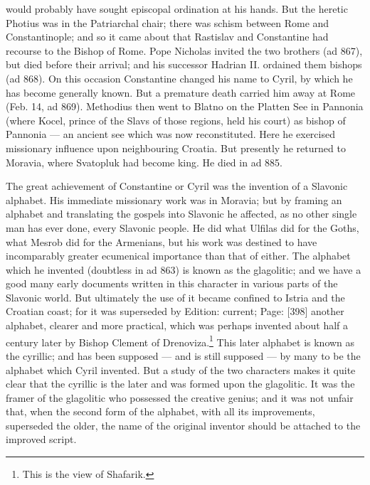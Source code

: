 would probably have sought episcopal ordination at his hands. But the heretic Photius was in the Patriarchal chair; there was schism between Rome and Constantinople; and so it came about that Rastislav and Constantine had recourse to the Bishop of Rome. Pope Nicholas invited the two brothers (ad 867), but died before their arrival; and his successor Hadrian II. ordained them bishops (ad 868). On this occasion Constantine changed his name to Cyril, by which he has become generally known. But a premature death carried him away at Rome (Feb. 14, ad 869). Methodius then went to Blatno on the Platten See in Pannonia (where Kocel, prince of the Slavs of those regions, held his court) as bishop of Pannonia \texthebrew{—} an ancient see which was now reconstituted. Here he exercised missionary influence upon neighbouring Croatia. But presently he returned to Moravia, where Svatopluk had become king. He died in ad 885.

The great achievement of Constantine or Cyril was the invention of a Slavonic alphabet. His immediate missionary work was in Moravia; but by framing an alphabet and translating the gospels into Slavonic he affected, as no other single man has ever done, every Slavonic people. He did what Ulfilas did for the Goths, what Mesrob did for the Armenians, but his work was destined to have incomparably greater ecumenical importance than that of either. The alphabet which he invented (doubtless in ad 863) is known as the glagolitic; and we have a good many early documents written in this character in various parts of the Slavonic world. But ultimately the use of it became confined to Istria and the Croatian coast; for it was superseded by Edition: current; Page: [398] another alphabet, clearer and more practical, which was perhaps invented about half a century later by Bishop Clement of Drenoviza.\footnote{This is the view of Shafarik.} This later alphabet is known as the cyrillic; and has been supposed \texthebrew{—} and is still supposed \texthebrew{—} by many to be the alphabet which Cyril invented. But a study of the two characters makes it quite clear that the cyrillic is the later and was formed upon the glagolitic. It was the framer of the glagolitic who possessed the creative genius; and it was not unfair that, when the second form of the alphabet, with all its improvements, superseded the older, the name of the original inventor should be attached to the improved script.

